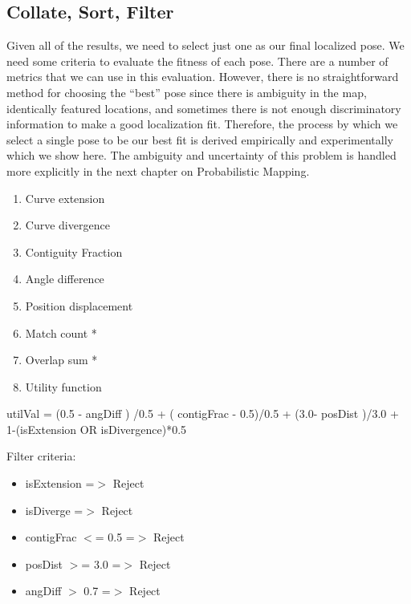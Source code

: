 \subsection{Collate, Sort, Filter}
\label{collatesortfilter}

Given all of the results, we need to select just one as our final localized pose. We need some criteria to evaluate the fitness of each pose. There are a number of metrics that we can use in this evaluation. However, there is no straightforward method for choosing the “best” pose since there is ambiguity in the map, identically featured locations, and sometimes there is not enough discriminatory information to make a good localization fit. Therefore, the process by which we select a single pose to be our best fit is derived empirically and experimentally which we show here. The ambiguity and uncertainty of this problem is handled more explicitly in the next chapter on Probabilistic Mapping.

\begin{enumerate}
\item Curve extension

\item Curve divergence

\item Contiguity Fraction

\item Angle difference

\item Position displacement

\item Match count *

\item Overlap sum *

\item Utility function

\end{enumerate}

utilVal = (0.5 - angDiff ) \slash  0.5 + ( contigFrac - 0.5)\slash 0.5 + (3.0- posDist )\slash 3.0 + 1-(isExtension OR isDivergence)*0.5

Filter criteria:

\begin{itemize}
\item isExtension =$>$ Reject

\item isDiverge =$>$ Reject

\item contigFrac $<$= 0.5 =$>$ Reject

\item posDist $>$= 3.0 =$>$ Reject

\item angDiff $>$ 0.7 =$>$ Reject

\end{itemize}

